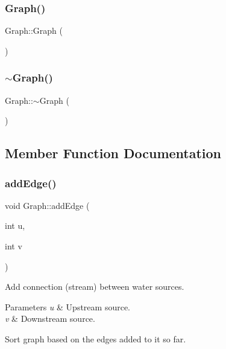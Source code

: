 \subsubsection{\texorpdfstring{Graph()}{Graph()}\hspace{0.1cm}{\footnotesize\ttfamily [2/2]}}
{\footnotesize\ttfamily Graph\+::\+Graph (\begin{DoxyParamCaption}{ }\end{DoxyParamCaption})}

\mbox{\label{classGraph_a902c5b3eacb66d60752525ab23297a95}} 
\subsubsection{\texorpdfstring{$\sim$\+Graph()}{~Graph()}}
{\footnotesize\ttfamily Graph\+::$\sim$\+Graph (\begin{DoxyParamCaption}{ }\end{DoxyParamCaption})\hspace{0.3cm}{\ttfamily [virtual]}}



\subsection{Member Function Documentation}
\mbox{\label{classGraph_ad8c10df34357b2cd865c81e0c4f0bd8c}} 
\subsubsection{\texorpdfstring{add\+Edge()}{addEdge()}}
{\footnotesize\ttfamily void Graph\+::add\+Edge (\begin{DoxyParamCaption}\item[{int}]{u,  }\item[{int}]{v }\end{DoxyParamCaption})}

Add connection (stream) between water sources. 
\begin{DoxyParams}{Parameters}
{\em u} & Upstream source. \\
\hline
{\em v} & Downstream source. \\
\hline
\end{DoxyParams}
Sort graph based on the edges added to it so far.

